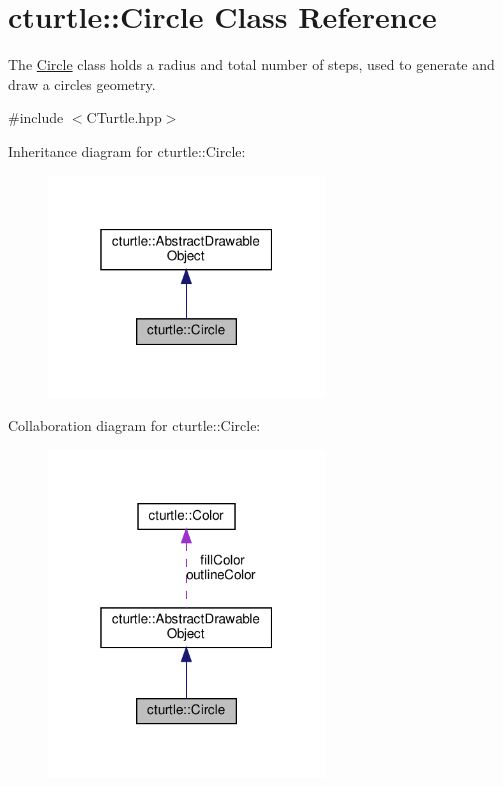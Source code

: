\hypertarget{classcturtle_1_1Circle}{}\section{cturtle\+:\+:Circle Class Reference}
\label{classcturtle_1_1Circle}


The \hyperlink{classcturtle_1_1Circle}{Circle} class holds a radius and total number of steps, used to generate and draw a circles geometry.  




{\ttfamily \#include $<$C\+Turtle.\+hpp$>$}



Inheritance diagram for cturtle\+:\+:Circle\+:\nopagebreak
\begin{figure}[H]
\begin{center}
\leavevmode
\includegraphics[width=208pt]{classcturtle_1_1Circle__inherit__graph}
\end{center}
\end{figure}


Collaboration diagram for cturtle\+:\+:Circle\+:\nopagebreak
\begin{figure}[H]
\begin{center}
\leavevmode
\includegraphics[width=208pt]{classcturtle_1_1Circle__coll__graph}
\end{center}
\end{figure}
